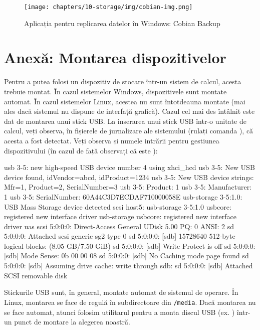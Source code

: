 \begin{figure}[!htbp]
  \centering
  \texttt{[image: chapters/10-storage/img/cobian-img.png]}
  \caption{Aplicația pentru replicarea datelor în Windows: Cobian Backup}
  \label{fig:storage:cobian}
\end{figure}

\section{Anexă: Montarea dispozitivelor}
\label{sec:storage:mount-cmd}

Pentru a putea folosi un dispozitiv de stocare într-un sistem de calcul, acesta trebuie montat.
În cazul sistemelor Windows, dispozitivele sunt montate automat.
 În cazul sistemelor Linux, acestea nu sunt întotdeauna montate (mai ales dacă sistemul nu dispune de interfață grafică).
Cazul cel mai des întâlnit este dat de montarea unui stick USB.
La inserarea unui stick USB într-o unitate de calcul, veți observa, în fișierele de jurnalizare ale sistemului (rulați comanda ), că acesta a fost detectat.
Veți observa și numele intrării pentru gestiunea dispozitivului (în cazul de față observați că este ):

\begin{screen}
usb 3-5: new high-speed USB device number 4 using xhci_hcd
usb 3-5: New USB device found, idVendor=abcd, idProduct=1234
usb 3-5: New USB device strings: Mfr=1, Product=2, SerialNumber=3
usb 3-5: Product: 1
usb 3-5: Manufacturer: 1
usb 3-5: SerialNumber: 60A44C3D7ECDAF710000058E
usb-storage 3-5:1.0: USB Mass Storage device detected
scsi host5: usb-storage 3-5:1.0
usbcore: registered new interface driver usb-storage
usbcore: registered new interface driver uas
scsi 5:0:0:0: Direct-Access     General  UDisk            5.00 PQ: 0 ANSI: 2
sd 5:0:0:0: Attached scsi generic sg2 type 0
sd 5:0:0:0: [sdb] 15728640 512-byte logical blocks: (8.05 GB/7.50 GiB)
sd 5:0:0:0: [sdb] Write Protect is off
sd 5:0:0:0: [sdb] Mode Sense: 0b 00 00 08
sd 5:0:0:0: [sdb] No Caching mode page found
sd 5:0:0:0: [sdb] Assuming drive cache: write through
 sdb:
sd 5:0:0:0: [sdb] Attached SCSI removable disk
\end{screen}

Stickurile USB sunt, în general, montate automat de sistemul de operare.
 În Linux, montarea se face de regulă în subdirectoare din \texttt{/media}.
 Dacă montarea nu se face automat, atunci folosim utilitarul  pentru a monta discul USB (ex. ) într-un punct de montare la alegerea noastră.


